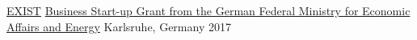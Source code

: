 


\begin{cvhonors}

  \cvhonor
    {\href{https://kit-gruenderschmiede.de/gruender-des-monats-nesto/}{EXIST}} %
    {\href{https://kit-gruenderschmiede.de/gruender-des-monats-nesto/}{Business Start-up Grant from the German Federal Ministry for Economic Affairs and Energy}} %
    {Karlsruhe, Germany} %
    {2017} %

\end{cvhonors}
